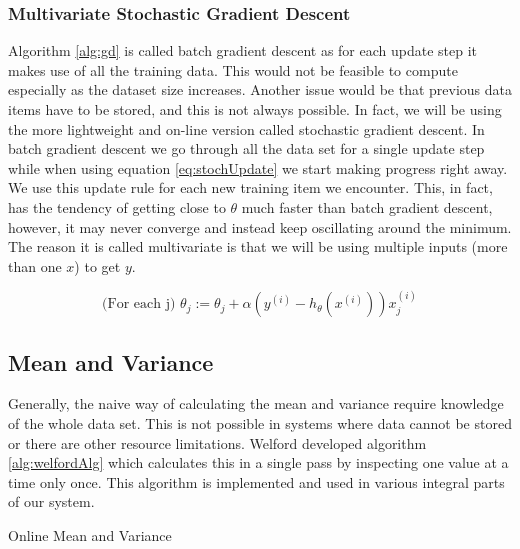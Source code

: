 \documentclass{mproj}
\begin{document}
\subsubsection{Multivariate Stochastic Gradient Descent}
Algorithm \ref{alg:gd} is called batch gradient descent as for each update step it makes use of all the training data. This would not be feasible to compute especially as the dataset size increases. Another issue would be that previous data items have to be stored, and this is not always possible. In fact, we will be using the more lightweight and on-line version called stochastic gradient descent. In batch gradient descent we go through all the data set for a single update step while when using equation \ref{eq:stochUpdate} we start making progress right away. We use this update rule for each new training item we encounter. This, in fact, has the tendency of getting close to $\theta$ much faster than batch gradient descent, however, it may never converge and instead keep oscillating around the minimum. The reason it is called multivariate is that we will be using multiple inputs (more than one $x$) to get $y$.

\begin{equation}
\label{eq:stochUpdate}
\text{(For each j) }\theta_j := \theta_j + \alpha(y^{(i)}-h_\theta(x^{(i)}))x_j^{(i)}
\end{equation}

\subsection{Mean and Variance}
\label{sec:meanvariance}
Generally, the naive way of calculating the mean and variance require knowledge of the whole data set. This is not possible in systems where data cannot be stored or there are other resource limitations. Welford \cite{meanvariance} developed algorithm \ref{alg:welfordAlg} which calculates this in a single pass by inspecting one value at a time only once. This algorithm is implemented and used in various integral parts of our system.

\begin{algorithm}[H]
\caption{Online Mean and Variance \cite{meanvariance}}
\label{alg:welfordAlg}
\end{algorithm}
\end{document}
